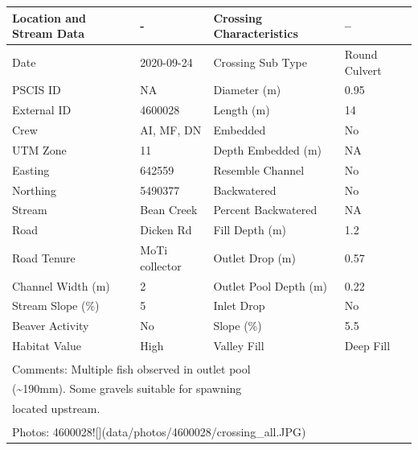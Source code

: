 \documentclass[
]{book}
\begin{document}
\begin{tabular}{llll}
\toprule
Location and Stream Data & - & Crossing Characteristics & --\\
\midrule
Date & 2020-09-24 & Crossing Sub Type & Round Culvert\\
PSCIS ID & NA & Diameter (m) & 0.95\\
External ID & 4600028 & Length (m) & 14\\
Crew & AI, MF, DN & Embedded & No\\
UTM Zone & 11 & Depth Embedded (m) & NA\\
\addlinespace
Easting & 642559 & Resemble Channel & No\\
Northing & 5490377 & Backwatered & No\\
Stream & Bean Creek & Percent Backwatered & NA\\
Road & Dicken Rd & Fill Depth (m) & 1.2\\
Road Tenure & MoTi collector & Outlet Drop (m) & 0.57\\
\addlinespace
Channel Width (m) & 2 & Outlet Pool Depth (m) & 0.22\\
Stream Slope (\%) & 5 & Inlet Drop & No\\
Beaver Activity & No & Slope (\%) & 5.5\\
Habitat Value & High & Valley Fill & Deep Fill\\
\bottomrule
\multicolumn{4}{l}{\textsuperscript{} Comments: Multiple fish observed in outlet pool}\\
\multicolumn{4}{l}{(\textasciitilde{}190mm).  Some gravels suitable for spawning}\\
\multicolumn{4}{l}{located upstream.}\\
\multicolumn{4}{l}{\textsuperscript{} Photos: 4600028![](data/photos/4600028/crossing\_all.JPG)}\\
\end{tabular}
\end{document}

